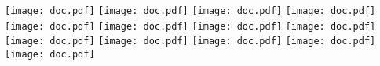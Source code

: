 \documentclass[a4paper]{article}
\begin{document}
\centering
\texttt{[image: doc.pdf]}
\texttt{[image: doc.pdf]}
\texttt{[image: doc.pdf]}
\texttt{[image: doc.pdf]}
\texttt{[image: doc.pdf]}
\texttt{[image: doc.pdf]}
\texttt{[image: doc.pdf]}
\texttt{[image: doc.pdf]}
\texttt{[image: doc.pdf]}
\texttt{[image: doc.pdf]}
\texttt{[image: doc.pdf]}
\texttt{[image: doc.pdf]}
\texttt{[image: doc.pdf]}
\end{document}
